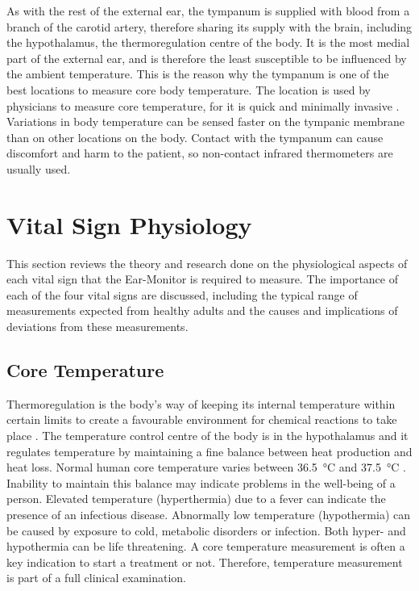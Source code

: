 \medskip
As with the rest of the external ear, the tympanum is supplied with blood from a branch of the carotid artery, therefore sharing its supply with the brain, including the hypothalamus, the thermoregulation centre of the body. It is the most medial part of the external ear, and is therefore the least susceptible to be influenced by the ambient temperature. This is the reason why the tympanum is one of the best locations to measure core body temperature. The location is used by physicians to measure core temperature, for it is quick and minimally invasive \citep{gasim2013accuracy}. Variations in body temperature can be sensed faster on the tympanic membrane than on other locations on the body. Contact with the tympanum can cause discomfort and harm to the patient, so non-contact infrared thermometers are usually used.


\section{Vital Sign Physiology} %
This section reviews the theory and research done on the physiological aspects of each vital sign that the Ear-Monitor is required to measure. The importance of each of the four vital signs are discussed, including the typical range of measurements expected from healthy adults and the causes and implications of deviations from these measurements.

\subsection{Core Temperature}
Thermoregulation is the body's way of keeping its internal temperature within certain limits to create a favourable environment for chemical reactions to take place \citep{thermoregulation2016}. The temperature control centre of the body is in the hypothalamus and it regulates temperature by maintaining a fine balance between heat production and heat loss. Normal human core temperature varies between \SI{36.5}{\celsius} and \SI{37.5}{\celsius} \citep{jones2010biomedical}. Inability to maintain this balance may indicate problems in the well-being of a person. Elevated temperature (hyperthermia) due to a fever can indicate the presence of an infectious disease. Abnormally low temperature (hypothermia) can be caused by exposure to cold, metabolic disorders or infection. Both hyper- and hypothermia can be life threatening. A core temperature measurement is often a key indication to start a treatment or not. Therefore, temperature measurement is part of a full clinical examination.

